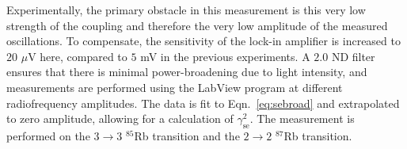 Experimentally, the primary obstacle in this measurement is this very low strength of the coupling and therefore the very low amplitude of the measured oscillations. To compensate, the sensitivity of the lock-in amplifier is increased to $20$  $\mu$V here, compared to $5$ mV in the previous experiments. A $2.0$ ND filter ensures that there is minimal power-broadening due to light intensity, and measurements are performed using the LabView program at different radiofrequency amplitudes. The data is fit to Eqn.~\ref{eq:sebroad} and extrapolated to zero amplitude, allowing for a calculation of $\gamma^2_{\mathrm{se}}$. The measurement is performed on the $3\rightarrow3$  $^{85}$Rb transition and the $2\rightarrow2$ $^{87}$Rb transition. 











